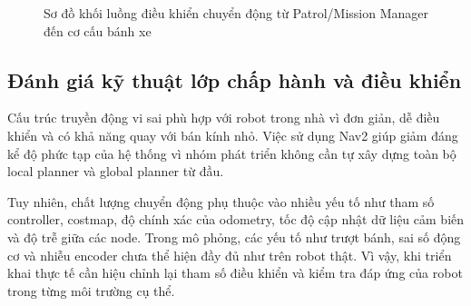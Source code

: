\begin{figure}[H]
\centering
{}
\caption{Sơ đồ khối luồng điều khiển chuyển động từ Patrol/Mission Manager đến cơ cấu bánh xe}
\label{fig:motion-control-data-flow}
\end{figure}

\subsection{Đánh giá kỹ thuật lớp chấp hành và điều khiển}
\label{subsec:actuator-control-assessment}

Cấu trúc truyền động vi sai phù hợp với robot trong nhà vì đơn giản, dễ điều khiển và có khả năng quay với bán kính nhỏ. Việc sử dụng Nav2 giúp giảm đáng kể độ phức tạp của hệ thống vì nhóm phát triển không cần tự xây dựng toàn bộ local planner và global planner từ đầu.

Tuy nhiên, chất lượng chuyển động phụ thuộc vào nhiều yếu tố như tham số controller, costmap, độ chính xác của odometry, tốc độ cập nhật dữ liệu cảm biến và độ trễ giữa các node. Trong mô phỏng, các yếu tố như trượt bánh, sai số động cơ và nhiễu encoder chưa thể hiện đầy đủ như trên robot thật. Vì vậy, khi triển khai thực tế cần hiệu chỉnh lại tham số điều khiển và kiểm tra đáp ứng của robot trong từng môi trường cụ thể.

